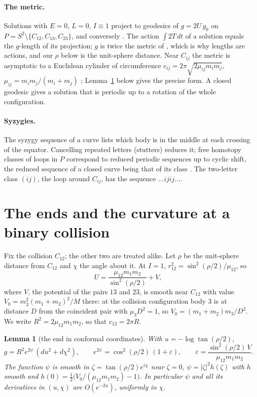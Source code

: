 \documentclass[11pt]{article}
\newtheorem{lemma}[theorem]{Lemma}
\theoremstyle{definition}
\begin{document}
\paragraph{The metric.} Solutions with $E=0$, $L=0$, $I\equiv1$ project to geodesics of $g=2U\,g_0$ on
$P=S^2\setminus\{C_{12},C_{13},C_{23}\}$, and conversely \cite{M05}. The action $\int 2T\,dt$ of a solution equals
the $g$-length of its projection; $g$ is twice the metric of \cite[(3.9a)]{M05}, which is why lengths are
actions, and our $\rho$ below is the unit-sphere distance. Near $C_{ij}$ the metric is asymptotic to a Euclidean cylinder of circumference
$c_{ij}=2\pi\sqrt{2\mu_{ij}m_im_j}$, $\mu_{ij}=m_im_j/(m_i+m_j)$ \cite[\S 3]{M05}; Lemma~\ref{lem:E}
below gives the precise form. A closed geodesic gives a solution that
is periodic up to a rotation of the whole configuration.

\paragraph{Syzygies.} The syzygy sequence of a curve lists which body is in the middle at each crossing of the
equator. Cancelling repeated letters (stutters) reduces it; free homotopy classes of loops in $P$ correspond to
reduced periodic sequences up to cyclic shift, the reduced sequence of a closed curve being that of its class
\cite{M05}. The two-letter class $(ij)$, the loop around $C_{ij}$, has the sequence $\dots ijij\dots$.

\section{The ends and the curvature at a binary collision}

Fix the collision $C_{12}$; the other two are treated alike. Let $\rho$ be the unit-sphere distance from $C_{12}$ and
$\chi$ the angle about it. At $I=1$, $r_{12}^2=\sin^2(\rho/2)/\mu_{12}$, so
\[
  U=\frac{\mu_{12}m_1m_2}{\sin^2(\rho/2)}+V,
\]
where $V$, the potential of the pairs $13$ and $23$, is smooth near $C_{12}$ with value $V_0=m_3^2(m_1+m_2)^2/M$ there:
at the collision configuration body $3$ is at distance $D$ from the coincident pair with $\mu_3D^2=1$, so
$V_0=(m_1+m_2)m_3/D^2$. We write $R^2=2\mu_{12}m_1m_2$, so that $c_{12}=2\pi R$.

\begin{lemma}[the end in conformal coordinates]\label{lem:E}
With $u=-\log\tan(\rho/2)$,
\[
  g=R^2e^{2\psi}\,(du^2+d\chi^2),\qquad e^{2\psi}=\cos^2(\rho/2)\,(1+\varepsilon),\qquad
  \varepsilon=\frac{\sin^2(\rho/2)\,V}{\mu_{12}m_1m_2}.
\]
The function $\psi$ is smooth in $\zeta=\tan(\rho/2)e^{i\chi}$ near $\zeta=0$, $\psi=|\zeta|^2h(\zeta)$ with $h$ smooth and
$h(0)=\tfrac12\bigl(V_0/(\mu_{12}m_1m_2)-1\bigr)$. In particular $\psi$ and all its derivatives in $(u,\chi)$ are
$O(e^{-2u})$, uniformly in $\chi$.
\end{lemma}
\end{document}
